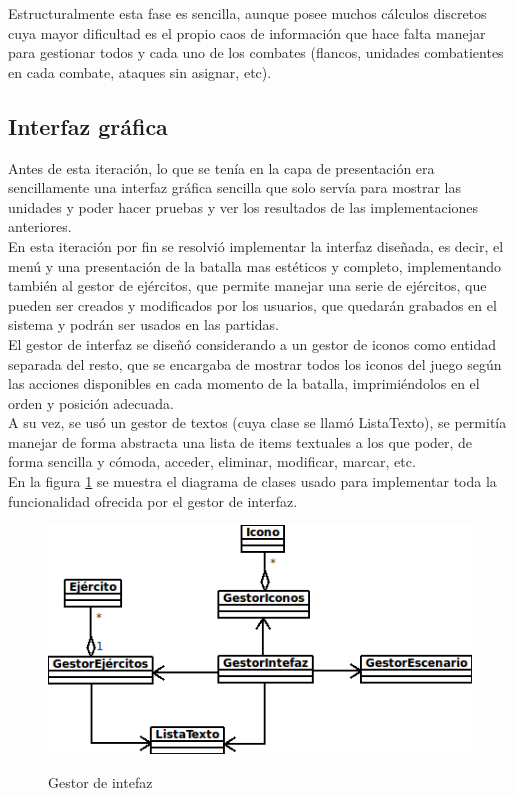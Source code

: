 \documentclass[a4paper,11pt]{article} %
\begin{document}
\noindent
Estructuralmente esta fase es sencilla, aunque posee muchos cálculos
discretos cuya mayor dificultad es el propio caos de información que
hace falta manejar para gestionar todos y cada uno de los combates
(flancos, unidades combatientes en cada combate, ataques sin asignar,
etc).

\subsection{Interfaz gráfica}
\label{sec:graf}
\noindent
Antes de esta iteración, lo que se tenía en la capa de presentación
era sencillamente una interfaz gráfica sencilla que solo servía para
mostrar las unidades y poder hacer pruebas y ver los resultados de las
implementaciones anteriores.\\

\noindent
En esta iteración por fin se resolvió implementar la interfaz
diseñada, es decir, el menú y una presentación de la batalla mas
estéticos y completo, implementando también al gestor de ejércitos,
que permite manejar una serie de ejércitos, que pueden ser creados y
modificados por los usuarios, que quedarán grabados en el sistema y
podrán ser usados en las partidas.\\

\noindent
El gestor de interfaz se diseñó considerando a un gestor de iconos
como entidad separada del resto, que se encargaba de mostrar todos los
iconos del juego según las acciones disponibles en cada momento de la
batalla, imprimiéndolos en el orden y posición adecuada.\\

\noindent
A su vez, se usó un gestor de textos (cuya clase se llamó ListaTexto),
se permitía manejar de forma abstracta una lista de items textuales a
los que poder, de forma sencilla y cómoda, acceder, eliminar,
modificar, marcar, etc.\\

\noindent
En la figura \ref{fig:interfaz} se muestra el diagrama de clases usado
para implementar toda la funcionalidad ofrecida por el gestor de interfaz.

\begin{figure}[h]
\centering
\includegraphics[scale=.8]{./imagenes/Interfaz.png}
\label{fig:interfaz}
\caption{Gestor de intefaz}
\end{figure}
\end{document}
